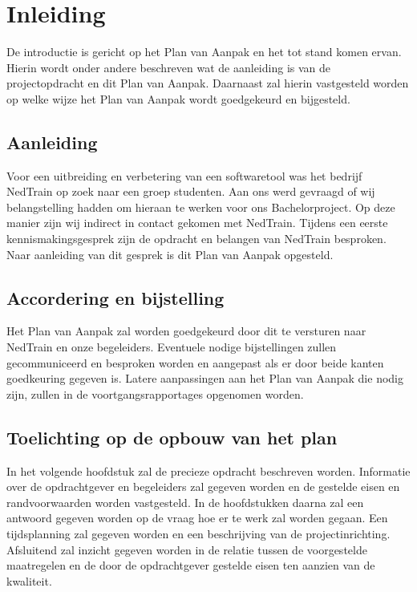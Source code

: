 \section{Inleiding}
De introductie is gericht op het Plan van Aanpak en het tot stand komen ervan. Hierin wordt onder andere beschreven wat de aanleiding is van de projectopdracht en dit Plan van Aanpak. Daarnaast zal hierin vastgesteld worden op welke wijze het Plan van Aanpak wordt goedgekeurd en bijgesteld.

\subsection{Aanleiding}
Voor een uitbreiding en verbetering van een softwaretool was het bedrijf NedTrain op zoek naar een groep studenten. Aan ons werd gevraagd of wij belangstelling hadden om hieraan te werken voor ons Bachelorproject. Op deze manier zijn wij indirect in contact gekomen met NedTrain. Tijdens een eerste kennismakingsgesprek zijn de opdracht en belangen van NedTrain besproken. Naar aanleiding van dit gesprek is dit Plan van Aanpak opgesteld.

\subsection{Accordering en bijstelling}
Het Plan van Aanpak zal worden goedgekeurd door dit te versturen naar NedTrain en onze begeleiders. Eventuele nodige bijstellingen zullen gecommuniceerd en besproken worden en aangepast als er door beide kanten goedkeuring gegeven is. Latere aanpassingen aan het Plan van Aanpak die nodig zijn, zullen in de voortgangsrapportages opgenomen worden.

\subsection{Toelichting op de opbouw van het plan}
In het volgende hoofdstuk zal de precieze opdracht beschreven worden. Informatie over de opdrachtgever en begeleiders zal gegeven worden en de gestelde eisen en randvoorwaarden worden vastgesteld. In de hoofdstukken daarna zal een antwoord gegeven worden op de vraag hoe er te werk zal worden gegaan. Een tijdsplanning zal gegeven worden en een beschrijving van de projectinrichting. Afsluitend zal inzicht gegeven worden in de relatie tussen de voorgestelde maatregelen en de door de opdrachtgever gestelde eisen ten aanzien van de kwaliteit.